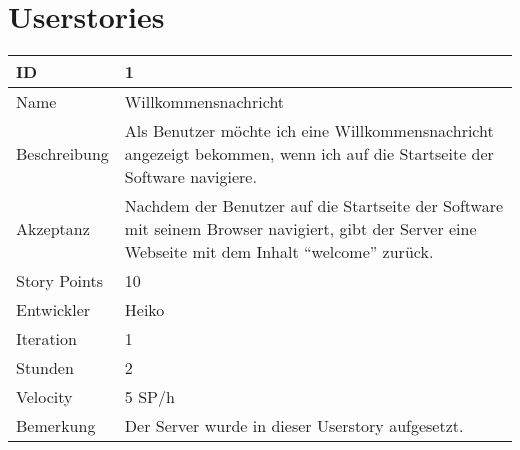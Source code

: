 \section{Userstories}

\begin{table}[htbp]
    \begin{minipage}{\linewidth}
        \setlength{\tymax}{0.5\linewidth}
        \centering
        \small
        \begin{tabulary}{\textwidth}{|l|p{10cm}|} \hline
            ID   & 1 \\\hline
            Name  & Willkommensnachricht\\\hline
	    Beschreibung& Als Benutzer möchte ich eine Willkommensnachricht angezeigt bekommen, wenn ich auf die Startseite der Software navigiere. \\\hline
	    Akzeptanz &Nachdem der Benutzer auf die Startseite der Software mit seinem Browser navigiert, gibt der Server eine Webseite mit dem Inhalt ``welcome'' zurück.\\\hline
            Story Points&10\\\hline
            Entwickler &Heiko\\\hline
            Iteration &1\\\hline
            Stunden  &2\\\hline
            Velocity &5 SP\slash h\\\hline
	    Bemerkung &Der Server wurde in dieser Userstory aufgesetzt.\\\hline
        \end{tabulary}
    \end{minipage}
\end{table}



